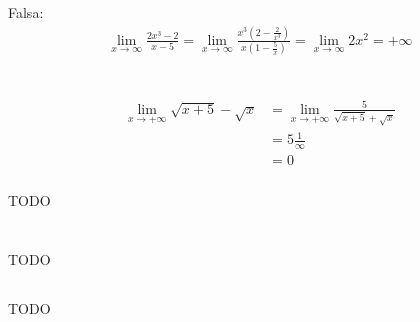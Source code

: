 \documentclass[12pt]{article}
\theoremstyle{definition}
\begin{document}
Falsa:
\begin{align*}
	\lim_{x\rightarrow \infty} \frac{2x^3 - 2}{x-5} = \lim_{x\rightarrow \infty} \frac{x^3(2-\frac{2}{x^3})}{x(1-\frac{5}{x})} = \lim_{x\rightarrow \infty} 2x^2 = +\infty
\end{align*}
\section{}
\subsection{}
\subsubsection{}
\begin{align*}
	\lim_{x \rightarrow +\infty} \sqrt{x+5} - \sqrt{x}
	&= \lim_{x \rightarrow +\infty} \frac{5}{\sqrt{x+5}+\sqrt{x}} \\
	&= 5 \frac{1}{\infty} \\
	&= 0
\end{align*}
\subsubsection{}
TODO

\section{}
\subsection{}
TODO

\subsection{}
TODO
\end{document}
